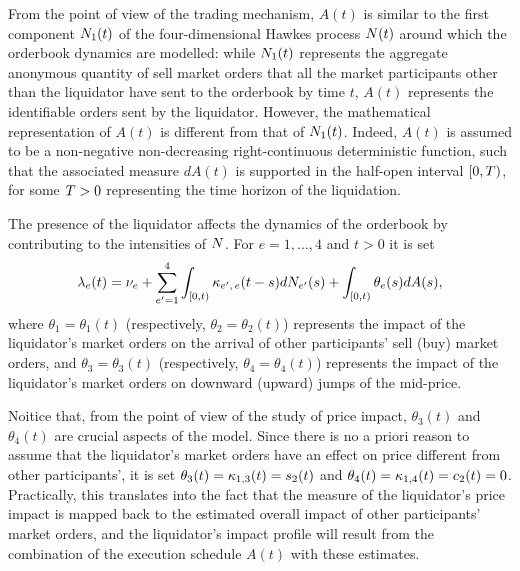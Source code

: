 \documentclass[10pt]{article}
\begin{document}
From the point of view of the trading mechanism, $A(t)$ is similar to the first component $\countingProc[1](t)$ of the four-dimensional Hawkes process $\multiCountingProc(t)$ around which the orderbook dynamics are modelled: while $\countingProc[1](t)$ represents the aggregate anonymous quantity of sell market orders that all the market participants other than the liquidator have sent to the orderbook by time $t$, $A(t)$ represents the identifiable orders sent by the liquidator.  However, the mathematical representation of $A(t)$ is different from that of  $\countingProc[1](t)$. Indeed, $A(t)$ is assumed to be a non-negative non-decreasing right-continuous deterministic function, such that the associated measure $dA(t)$ is supported in the half-open interval $[0,\timeHorizon)$, for some $\timeHorizon>0$ representing the time horizon of the liquidation.

The presence of the liquidator affects the dynamics of the orderbook by contributing to the intensities of $\multiCountingProc$. For $e=1,\dots,4$ and $t>0$ it is set 
\begin{equation}\label{eq.BM14_intensity_with_liquidator}
 \intensity[e](t) = 
 \baseRate_e
 +\sum_{\eone=1}^{4}\int_{[0,t)} \hawkesKernel\subscriptee (t-s)d\countingProc[\eone](s) 
 + \int_{[0,t)} \theta_e(s)dA(s),
\end{equation}
where $\theta_1 = \theta_1(t)$ (respectively, $\theta_2=\theta_2(t)$) represents the impact of the liquidator's market orders on the arrival of other participants' sell (buy) market orders, and $\theta_3 = \theta_3(t)$ (respectively, $\theta_4 = \theta_4(t)$) represents the impact of the liquidator's market orders on downward (upward) jumps of the mid-price.

Noitice that, from the point of view of the study of price impact, $\theta_3(t)$ and $\theta_4(t)$ are crucial aspects of the model. Since there is no a priori reason to assume that the liquidator's market orders have an effect on price different from other participants', it is set $\theta_3(t) = \hawkesKernel_{1,3}(t) = s_2(t)$ and $\theta_4(t)=\hawkesKernel_{1,4}(t)=c_2(t)=0$. Practically, this translates into the fact that the measure of the liquidator's price impact is mapped back to the estimated overall impact of other participants' market orders, and the liquidator's impact profile will result from the combination of the execution schedule $A(t)$ with these estimates.
\end{document}
